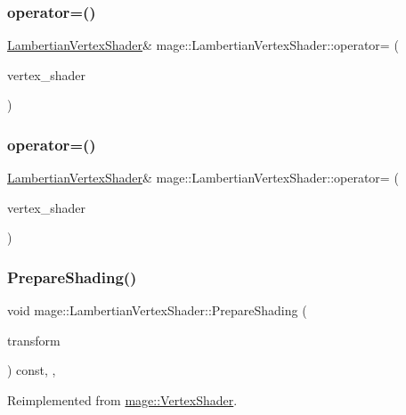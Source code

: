 \subsubsection{\texorpdfstring{operator=()}{operator=()}\hspace{0.1cm}{\footnotesize\ttfamily [1/2]}}
{\footnotesize\ttfamily \hyperlink{classmage_1_1_lambertian_vertex_shader}{Lambertian\+Vertex\+Shader}\& mage\+::\+Lambertian\+Vertex\+Shader\+::operator= (\begin{DoxyParamCaption}\item[{const \hyperlink{classmage_1_1_lambertian_vertex_shader}{Lambertian\+Vertex\+Shader} \&}]{vertex\+\_\+shader }\end{DoxyParamCaption})\hspace{0.3cm}{\ttfamily [delete]}}

\hypertarget{classmage_1_1_lambertian_vertex_shader_ae0a53e712856923403c1f7542941df6e}{}\label{classmage_1_1_lambertian_vertex_shader_ae0a53e712856923403c1f7542941df6e} 
\subsubsection{\texorpdfstring{operator=()}{operator=()}\hspace{0.1cm}{\footnotesize\ttfamily [2/2]}}
{\footnotesize\ttfamily \hyperlink{classmage_1_1_lambertian_vertex_shader}{Lambertian\+Vertex\+Shader}\& mage\+::\+Lambertian\+Vertex\+Shader\+::operator= (\begin{DoxyParamCaption}\item[{\hyperlink{classmage_1_1_lambertian_vertex_shader}{Lambertian\+Vertex\+Shader} \&\&}]{vertex\+\_\+shader }\end{DoxyParamCaption})\hspace{0.3cm}{\ttfamily [delete]}}

\hypertarget{classmage_1_1_lambertian_vertex_shader_a51c0fcfc36cdf87e4e55c94529c0081a}{}\label{classmage_1_1_lambertian_vertex_shader_a51c0fcfc36cdf87e4e55c94529c0081a} 
\subsubsection{\texorpdfstring{Prepare\+Shading()}{PrepareShading()}}
{\footnotesize\ttfamily void mage\+::\+Lambertian\+Vertex\+Shader\+::\+Prepare\+Shading (\begin{DoxyParamCaption}\item[{I\+D3\+D11\+Buffer $\ast$}]{transform }\end{DoxyParamCaption}) const\hspace{0.3cm}{\ttfamily [final]}, {\ttfamily [override]}, {\ttfamily [virtual]}}



Reimplemented from \hyperlink{classmage_1_1_vertex_shader_a53f4b25241f6c5739724d421c9f29a36}{mage\+::\+Vertex\+Shader}.

